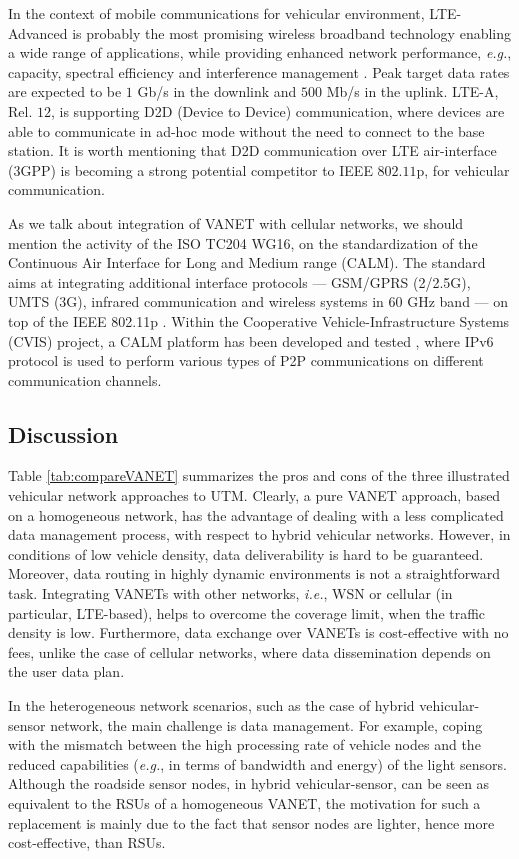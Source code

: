 \documentclass[10pt,onecolumn]{article}
\begin{document}
In the context of mobile communications for vehicular environment, LTE-Advanced is probably the most promising wireless broadband technology enabling a wide range of applications, while providing enhanced network performance, \textit{e.g.}, capacity, spectral efficiency and interference management \cite{Ali2013}. Peak target data rates are expected to be $1$ Gb/s in the downlink and $500$ Mb/s in the uplink. LTE-A, Rel. $12$, is supporting D2D (Device to Device) communication, where devices are able to communicate in ad-hoc mode without the need to connect to the base station. It is worth mentioning that D2D communication over LTE air-interface (3GPP) is becoming a strong potential competitor to IEEE $802.11$p, for vehicular communication.

As we talk about integration of VANET with cellular networks, we should mention the activity of the ISO TC204 WG16, on the standardization of the Continuous Air Interface for Long and Medium range (CALM). The standard aims at integrating additional interface protocols --- GSM/GPRS (2/2.5G), UMTS (3G), infrared communication and wireless systems in $60$ GHz band --- on top of the IEEE 802.11p \cite{calm01,calm03}.
Within the Cooperative Vehicle-Infrastructure Systems (CVIS) project, a CALM platform has been developed and tested \cite{cvis}, where IPv6 protocol is used to perform various types of P2P communications on different communication channels.

\subsection{Discussion}
Table \ref{tab:compareVANET} summarizes the pros and cons of the three illustrated vehicular network approaches to UTM. Clearly, a pure VANET approach, based on a homogeneous network, has the advantage of dealing with a less complicated data management process, with respect to hybrid vehicular networks. However, in conditions of low vehicle density, data deliverability is hard to be guaranteed. 
Moreover, data routing in highly dynamic environments is not a straightforward task. Integrating VANETs with other networks, \textit{i.e.}, WSN or cellular (in particular, LTE-based), helps to overcome the coverage limit, when the traffic density is low. Furthermore, data exchange over VANETs is cost-effective with no fees, unlike the case of cellular networks, where data dissemination depends on the user data plan.

In the heterogeneous network scenarios, such as the case of hybrid vehicular-sensor network, the main challenge is data management. For example, coping with the mismatch between the high processing rate of vehicle nodes and the reduced capabilities (\textit{e.g.}, in terms of bandwidth and energy) of the light sensors.  
Although the roadside sensor nodes, in hybrid vehicular-sensor, can be seen as equivalent to the RSUs of a homogeneous VANET, the motivation for such a replacement is mainly due to the fact that sensor nodes are lighter, hence more cost-effective, than RSUs.
\end{document}
